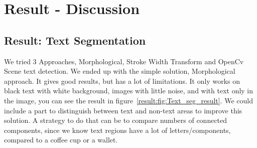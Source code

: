 \documentclass[Report.tex]{subfiles}
\begin{document}
\chapter{Result - Discussion}
\label{chap:Result - Discussion}
\section{Result: Text Segmentation}
We tried 3 Approaches, Morphological, Stroke Width Transform and OpenCv Scene text detection. We ended up with the simple solution, Morphological approach. It gives good results, but has a lot of limitations. It only works on black text with white background, images with little noise, and with text only in the image, you can see the result in figure~\ref{result:fig:Text_seg_result}. We could include a part to distinguish between text and non-text areas to improve this solution. A strategy to do that can be to compare numbers of connected components, since we know text regions have a lot of letters/components, compared to a coffee cup or a wallet.
\end{document}
